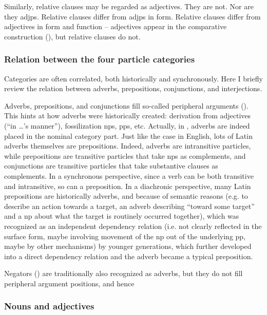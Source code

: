 \documentclass{article}
\begin{document}
Similarly, relative clauses may be regarded as adjectives.
They are not. Nor are they \ac{adjp}s.
Relative clauses differ from \ac{adjp}s in form.
Relative clauses differ from adjectives in form and function 
-- adjectives appear in the comparative construction (),
but relative clauses do not.

\subsubsection{Relation between the four particle categories}

Categories are often correlated, both historically and synchronously.
Here I briefly review the relation between adverbs, prepositions, conjunctions, and interjections. %

Adverbs, prepositions, and conjunctions fill so-called peripheral arguments ().
This hints at how adverbs were historically created:
derivation from adjectives (``in \dots's manner''), 
fossilization \ac{np}s, \ac{pp}s, etc.
Actually, in \citet{forker2020grammar}, adverbs are indeed placed in the nominal category part.
Just like the case in English, 
lots of Latin adverbs themselves are prepositions.
Indeed, adverbs are intransitive particles,
while prepositions are transitive particles that take \ac{np}s as complements,
and conjunctions are transitive particles that take substantive clauses as complements.
In a synchronous perspective, since a verb can be both transitive and intransitive,
so can a preposition.
In a diachronic perspective, many Latin prepositions are historically adverbs, 
and because of semantic reasons (e.g. to describe an action towards a target,
an adverb describing ``toward some target'' and a \ac{np} about what the target is routinely occurred together),
which was recognized as an independent dependency relation 
(i.e. not clearly reflected in the surface form,
maybe involving movement of the \ac{np} out of the underlying \ac{pp},
maybe by other mechanisms) 
by younger generations,
which further developed into a direct dependency relation
and the adverb became a typical preposition.

Negators () are traditionally also recognized as adverbs, 
but they do not fill peripheral argument positions,
and hence %


\subsubsection{Nouns and adjectives}
\end{document}
